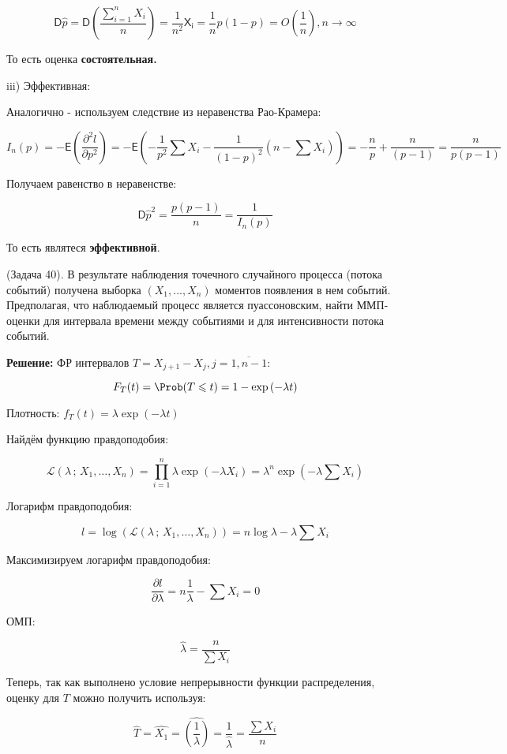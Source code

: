 \documentclass[12pt]{article}
\theoremstyle{definiton}
\theoremstyle{definition}
\theoremstyle{definition}
\let\leq\leqslant
\newcommand{\Expect}{\mathsf{E}}
\newcommand{\Disp}{\mathsf{D}}
\newcounter{problem}
\newcounter{subproblem}
\def\prp{\medskip\noindent\stepcounter{problem}{\bf Задача \theproblem .  }\setcounter{subproblem}{0} }
\begin{document}
$$\mathsf{D} \hat p = \mathsf{D} \left(\frac{ \sum\limits_{i=1}^n X_i}{n}\right) = \frac{1}{n^2} \mathsf{X_i} = \frac{1}{n} p(1-p) = O\left( \frac1n \right), n \to \infty$$

То есть оценка \textbf{состоятельная.}

iii) Эффективная:

Аналогично - используем следствие из неравенства Рао-Крамера:


$$I_n(p) = -  \Expect \left(\frac{\partial^2 l}{\partial p^2}\right) =  - \Expect \left( - \frac{1}{p^2} \sum X_i - \frac{1}{(1-p)^2} (n - \sum X_i) \right) = -\frac{n}{p} + \frac{n}{(p-1)} = \frac{n}{p(p-1)}$$


Получаем равенство в неравенстве:

$$\Disp \hat{p}^2 = \frac{p(p-1)}{n} =  \frac{1}{I_n(p)}$$

То есть являтеся \textbf{эффективной}. 


\prp (Задача 40). В результате наблюдения точечного случайного процесса (потока событий) получена выборка $(X_1, . . . , X_n)$ моментов появления в нем событий. Предполагая, что наблюдаемый процесс является пуассоновским, найти ММП-оценки для интервала времени между событиями и для интенсивности потока событий.

\textbf{Решение: } ФР интервалов $T = X_{j+1} - X_j, j = \overline{1,n-1}$:

$$F_T(t) = \Prob(T \leq t) = 1 - \exp{(-\lambda t)}$$

Плотность: $f_T(t) = \lambda \exp{(-\lambda t)}$

Найдём функцию правдоподобия:


$$\mathcal{L}(\lambda \,;\,X_1,\ldots,X_n) = \prod\limits_{i=1}^n \lambda \exp{(-\lambda X_i)} = \lambda^n \exp{(-\lambda\sum X_i)}$$

Логарифм правдоподобия:

$$l = \log{(\mathcal{L}(\lambda \,;\,X_1,\ldots,X_n))} = n \log \lambda - \lambda \sum X_i$$ 

Максимизируем логарифм правдоподобия:

$$\frac{\partial l}{\partial \lambda} = n \frac{1}{\lambda} - \sum X_i = 0$$

ОМП:

$$ \hat \lambda = \frac{n}{\sum X_i}$$

Теперь, так как выполнено условие непрерывности функции распределения, оценку для $T$ можно получить используя:

$$\hat{T} = \hat{X_{1}} = \hat{\left(\frac{1}{\lambda}\right)} = \frac{1}{\hat\lambda} = \frac{\sum X_i}{n}$$
\end{document}
